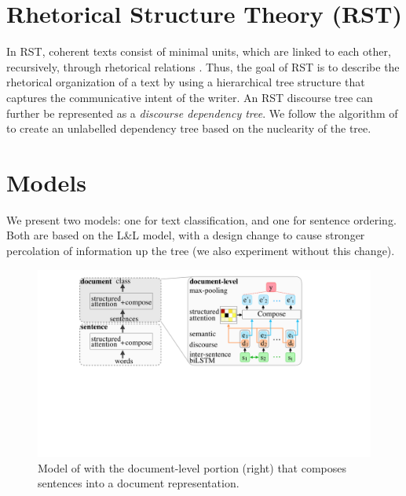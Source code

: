 \section{Rhetorical Structure Theory (RST)}
In RST, coherent texts consist of minimal units, which are linked to each other, recursively, through rhetorical relations \cite{Mann:1988}. Thus, the goal of RST is to describe the rhetorical organization of a text by using a hierarchical tree structure that captures the communicative intent of the writer. An RST discourse tree can further be represented as a \emph{discourse dependency tree}. We follow the algorithm of \citet{Hirao:2013} to create an unlabelled dependency tree based on the nuclearity of the tree.


\section{Models}
\label{sec:models}
We present two models: one for text classification, and one for sentence ordering. Both are based on the L\&L model, with a design change to cause stronger percolation of information up the tree (we also experiment without this change). 

\begin{figure}[t]
\centering
\includegraphics[scale=0.15]{plots/latent_liu_lapata_var_schematic.pdf}
\vspace{-0.2em}
\caption{Model of \citet{Liu:2018} with the document-level portion (right) that composes sentences into a document representation.}
\label{fig:model}
\vspace{-0.4em}
\end{figure}


